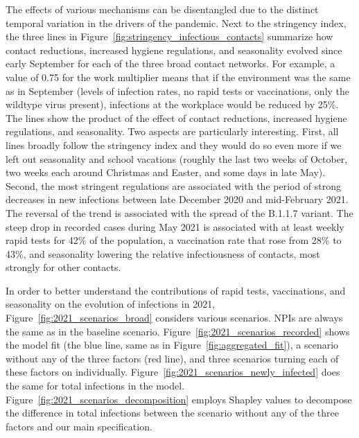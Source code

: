 The effects of various mechanisms can be disentangled due to the distinct temporal
variation in the drivers of the pandemic. Next to the stringency index, the three lines
in Figure~\ref{fig:stringency_infectious_contacts} summarize how contact reductions,
increased hygiene regulations, and seasonality evolved since early September for each of
the three broad contact networks. For example, a value of 0.75 for the work multiplier
means that if the environment was the same as in September (levels of infection rates,
no rapid tests or vaccinations, only the wildtype virus present), infections at the
workplace would be reduced by 25\%. The lines show the product of the effect of contact
reductions, increased hygiene regulations, and seasonality. Two aspects are particularly
interesting. First, all lines broadly follow the stringency index and they would do so
even more if we left out seasonality and school vacations (roughly the last two weeks of
October, two weeks each around Christmas and Easter, and some days in late May). Second,
the most stringent regulations are associated with the period of strong decreases in new
infections between late December 2020 and mid-February 2021. The reversal of the trend
is associated with the spread of the B.1.1.7 variant. The steep drop in recorded cases
during May 2021 is associated with at least weekly rapid tests for 42\% of the
population, a vaccination rate that rose from 28\% to 43\%, and seasonality lowering the
relative infectiousness of contacts, most strongly for other contacts.

In order to better understand the contributions of rapid tests, vaccinations, and
seasonality on the evolution of infections in 2021, Figure~\ref{fig:2021_scenarios_broad}
considers various scenarios. NPIs are always the same as in the baseline scenario.
Figure~\ref{fig:2021_scenarios_recorded} shows the model fit (the blue line, same as in
Figure~\ref{fig:aggregated_fit}), a scenario without any of the three factors (red line),
and three scenarios turning each of these factors on individually.
Figure~\ref{fig:2021_scenarios_newly_infected} does the same for total infections in the
model. Figure~\ref{fig:2021_scenarios_decomposition} employs Shapley values
\citep{Shapley2016} to decompose the difference in total infections between the scenario
without any of the three factors and our main specification.

